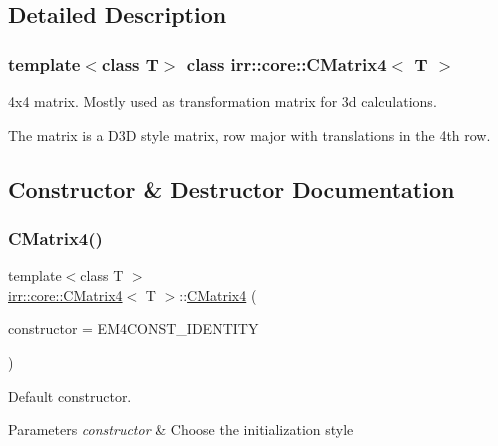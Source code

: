 \subsection{Detailed Description}
\subsubsection*{template$<$class T$>$\newline
class irr\+::core\+::\+C\+Matrix4$<$ T $>$}

4x4 matrix. Mostly used as transformation matrix for 3d calculations. 

The matrix is a D3D style matrix, row major with translations in the 4th row. 

\subsection{Constructor \& Destructor Documentation}
\mbox{\label{classirr_1_1core_1_1CMatrix4_af771bfde63cdaa3baa4d9f6121e56411}} 
\subsubsection{\texorpdfstring{C\+Matrix4()}{CMatrix4()}\hspace{0.1cm}{\footnotesize\ttfamily [1/2]}}
{\footnotesize\ttfamily template$<$class T $>$ \\
\hyperlink{classirr_1_1core_1_1CMatrix4}{irr\+::core\+::\+C\+Matrix4}$<$ T $>$\+::\hyperlink{classirr_1_1core_1_1CMatrix4}{C\+Matrix4} (\begin{DoxyParamCaption}\item[{\hyperlink{classirr_1_1core_1_1CMatrix4_a7bb79712227617f706ed57a34f3eb4fe}{e\+Constructor}}]{constructor = {\ttfamily EM4CONST\+\_\+IDENTITY} }\end{DoxyParamCaption})\hspace{0.3cm}{\ttfamily [inline]}}



Default constructor. 


\begin{DoxyParams}{Parameters}
{\em constructor} & Choose the initialization style \\
\hline
\end{DoxyParams}
\mbox{\label{classirr_1_1core_1_1CMatrix4_acdb7afc2248d97a7e882cd1bdeed07b7}} 

